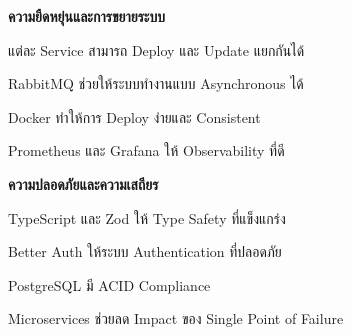 \vspace{0.5em}
\textbf{ความยืดหยุ่นและการขยายระบบ}
\vspace{0.5em}

\begin{mycustomenum2}
    \item แต่ละ Service สามารถ Deploy และ Update แยกกันได้
    \item RabbitMQ ช่วยให้ระบบทำงานแบบ Asynchronous ได้
    \item Docker ทำให้การ Deploy ง่ายและ Consistent
    \item Prometheus และ Grafana ให้ Observability ที่ดี
\end{mycustomenum2}

\vspace{0.5em}
\textbf{ความปลอดภัยและความเสถียร}
\vspace{0.5em}

\begin{mycustomenum2}
    \item TypeScript และ Zod ให้ Type Safety ที่แข็งแกร่ง
    \item Better Auth ให้ระบบ Authentication ที่ปลอดภัย
    \item PostgreSQL มี ACID Compliance
    \item Microservices ช่วยลด Impact ของ Single Point of Failure
\end{mycustomenum2}